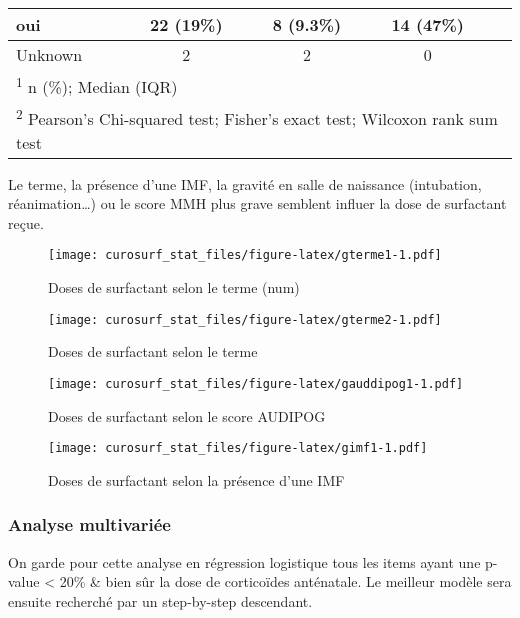\documentclass[
  10pt,
  a4paper,
]{scrartcl}
\begin{document}
\begin{table}
\begin{tabular}[t]{l|c|c|c|c}
\hline
\hspace{1em}oui & 22 (19\%) & 8 (9.3\%) & 14 (47\%) & \\
\hline
\hspace{1em}Unknown & 2 & 2 & 0 & \\
\hline
\multicolumn{5}{l}{\rule{0pt}{1em}\textsuperscript{1} n (\%); Median (IQR)}\\
\multicolumn{5}{l}{\rule{0pt}{1em}\textsuperscript{2} Pearson's Chi-squared test; Fisher's exact test; Wilcoxon rank sum test}\\
\end{tabular}
\end{table}

Le terme, la présence d'une IMF, la gravité en salle de naissance
(intubation, réanimation\ldots) ou le score MMH plus grave semblent
influer la dose de surfactant reçue.

\begin{figure}
\centering
\texttt{[image: curosurf\_stat\_files/figure-latex/gterme1-1.pdf]}
\caption{Doses de surfactant selon le terme (num)}
\end{figure}

\begin{figure}
\centering
\texttt{[image: curosurf\_stat\_files/figure-latex/gterme2-1.pdf]}
\caption{Doses de surfactant selon le terme}
\end{figure}

\begin{figure}
\centering
\texttt{[image: curosurf\_stat\_files/figure-latex/gauddipog1-1.pdf]}
\caption{Doses de surfactant selon le score AUDIPOG}
\end{figure}

\begin{figure}
\centering
\texttt{[image: curosurf\_stat\_files/figure-latex/gimf1-1.pdf]}
\caption{Doses de surfactant selon la présence d'une IMF}
\end{figure}

\hypertarget{analyse-multivariuxe9e}{%
\subsubsection{Analyse multivariée}\label{analyse-multivariuxe9e}}

On garde pour cette analyse en régression logistique tous les items
ayant une p-value \textless{} 20\% \& bien sûr la dose de corticoïdes
anténatale. Le meilleur modèle sera ensuite recherché par un
step-by-step descendant.
\end{document}
